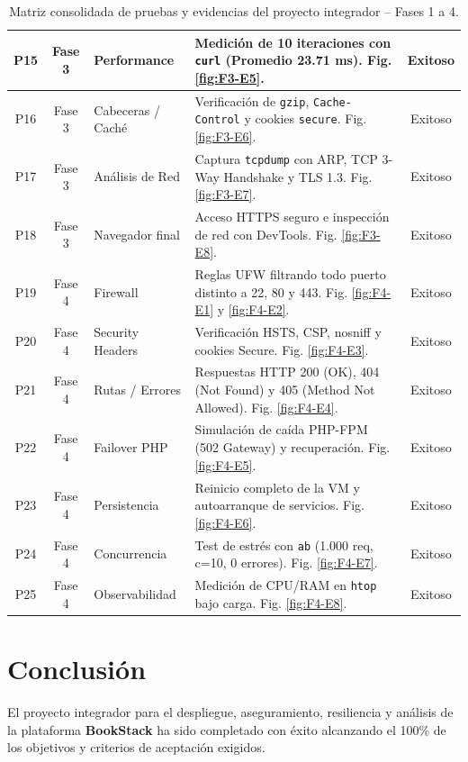 \documentclass[12pt,a4paper]{article}
\begin{document}
\begin{table}[H]
\begin{tabular}{|c|c|p{2.8cm}|p{6.6cm}|c|}
P15 & Fase 3 & Performance & Medición de 10 iteraciones con \texttt{curl} (Promedio 23.71 ms). Fig. \ref{fig:F3-E5}. & Exitoso \\ \hline
P16 & Fase 3 & Cabeceras / Caché & Verificación de \texttt{gzip}, \texttt{Cache-Control} y cookies \texttt{secure}. Fig. \ref{fig:F3-E6}. & Exitoso \\ \hline
P17 & Fase 3 & Análisis de Red & Captura \texttt{tcpdump} con ARP, TCP 3-Way Handshake y TLS 1.3. Fig. \ref{fig:F3-E7}. & Exitoso \\ \hline
P18 & Fase 3 & Navegador final & Acceso HTTPS seguro e inspección de red con DevTools. Fig. \ref{fig:F3-E8}. & Exitoso \\ \hline
P19 & Fase 4 & Firewall & Reglas UFW filtrando todo puerto distinto a 22, 80 y 443. Fig. \ref{fig:F4-E1} y \ref{fig:F4-E2}. & Exitoso \\ \hline
P20 & Fase 4 & Security Headers & Verificación HSTS, CSP, nosniff y cookies Secure. Fig. \ref{fig:F4-E3}. & Exitoso \\ \hline
P21 & Fase 4 & Rutas / Errores & Respuestas HTTP 200 (OK), 404 (Not Found) y 405 (Method Not Allowed). Fig. \ref{fig:F4-E4}. & Exitoso \\ \hline
P22 & Fase 4 & Failover PHP & Simulación de caída PHP-FPM (502 Gateway) y recuperación. Fig. \ref{fig:F4-E5}. & Exitoso \\ \hline
P23 & Fase 4 & Persistencia & Reinicio completo de la VM y autoarranque de servicios. Fig. \ref{fig:F4-E6}. & Exitoso \\ \hline
P24 & Fase 4 & Concurrencia & Test de estrés con \texttt{ab} (1.000 req, c=10, 0 errores). Fig. \ref{fig:F4-E7}. & Exitoso \\ \hline
P25 & Fase 4 & Observabilidad & Medición de CPU/RAM en \texttt{htop} bajo carga. Fig. \ref{fig:F4-E8}. & Exitoso \\ \hline
\end{tabular}
\caption{Matriz consolidada de pruebas y evidencias del proyecto integrador -- Fases 1 a 4.}
\label{tab:matriz_pruebas_consolidada}
\end{table}

\section{Conclusión}
El proyecto integrador para el despliegue, aseguramiento, resiliencia y análisis de la plataforma \textbf{BookStack} ha sido completado con éxito alcanzando el 100\% de los objetivos y criterios de aceptación exigidos.
\end{document}
